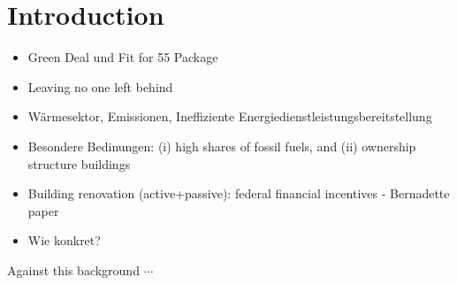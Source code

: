 \section{Introduction}
\begin{itemize}
	\item[\textcolor{col}{\textbullet}] \textcolor{col}{Green Deal und Fit for 55 Package}
	\item[\textcolor{col}{\textbullet}] \textcolor{col}{Leaving no one left behind}
	\item[\textcolor{col}{\textbullet}] \textcolor{col}{Wärmesektor, Emissionen, Ineffiziente Energiedienstleistungsbereitstellung}
	\item[\textcolor{col}{\textbullet}] \textcolor{col}{Besondere Bedinungen: (i) high shares of fossil fuels, and (ii) ownership structure buildings}
	\item[\textcolor{col}{\textbullet}] \textcolor{col}{Building renovation (active+passive): federal financial incentives - Bernadette paper}
	\item[\textcolor{col}{\textbullet}] \textcolor{col}{Wie konkret?}
\end{itemize}

\textcolor{col}{Against this background $\cdots$}



